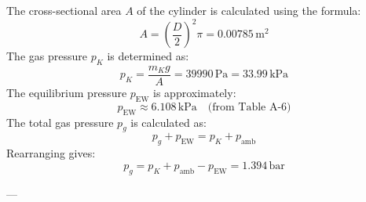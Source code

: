 The cross-sectional area \( A \) of the cylinder is calculated using the formula:  
\[
A = \left(\frac{D}{2}\right)^2 \pi = 0.00785 \, \text{m}^2
\]  
The gas pressure \( p_K \) is determined as:  
\[
p_K = \frac{m_K g}{A} = 39990 \, \text{Pa} = 33.99 \, \text{kPa}
\]  
The equilibrium pressure \( p_{\text{EW}} \) is approximately:  
\[
p_{\text{EW}} \approx 6.108 \, \text{kPa} \quad \text{(from Table A-6)}
\]  
The total gas pressure \( p_g \) is calculated as:  
\[
p_g + p_{\text{EW}} = p_K + p_{\text{amb}}
\]  
Rearranging gives:  
\[
p_g = p_K + p_{\text{amb}} - p_{\text{EW}} = 1.394 \, \text{bar}
\]  

---
